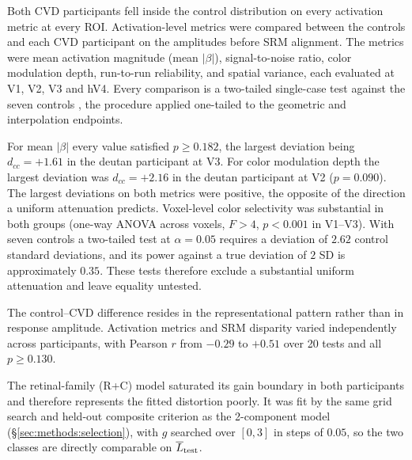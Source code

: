 

Both CVD participants fell inside the control distribution on every activation metric at every ROI. Activation-level metrics were compared between the controls and each CVD participant on the amplitudes before SRM alignment. The metrics were mean activation magnitude (mean $|\beta|$), signal-to-noise ratio, color modulation depth, run-to-run reliability, and spatial variance, each evaluated at V1, V2, V3 and hV4. Every comparison is a two-tailed single-case test against the seven controls \parencite{crawford1998}, the procedure applied one-tailed to the geometric and interpolation endpoints.

For mean $|\beta|$ every value satisfied $p \geq 0.182$, the largest deviation being $d_{cc} = +1.61$ in the deutan participant at V3. For color modulation depth the largest deviation was $d_{cc} = +2.16$ in the deutan participant at V2 ($p = 0.090$). The largest deviations on both metrics were positive, the opposite of the direction a uniform attenuation predicts. Voxel-level color selectivity was substantial in both groups (one-way ANOVA across voxels, $F > 4$, $p < 0.001$ in V1--V3). With seven controls a two-tailed test at $\alpha = 0.05$ requires a deviation of $2.62$ control standard deviations, and its power against a true deviation of $2$ SD is approximately $0.35$. These tests therefore exclude a substantial uniform attenuation and leave equality untested.

The control--CVD difference resides in the representational pattern rather than in response amplitude. Activation metrics and SRM disparity varied independently across participants, with Pearson $r$ from $-0.29$ to $+0.51$ over 20 tests and all $p \geq 0.130$.




The retinal-family (R+C) model saturated its gain boundary in both participants and therefore represents the fitted distortion poorly. It was fit by the same grid search and held-out composite criterion as the 2-component model (\S\ref{sec:methods:selection}), with $g$ searched over $[0, 3]$ in steps of $0.05$, so the two classes are directly comparable on $\overline{L}_{\rm test}$.

